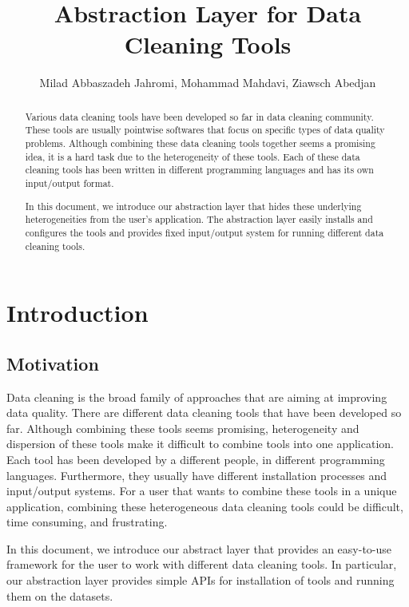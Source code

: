 \documentclass[12pt]{article}
\title{Abstraction Layer for Data Cleaning Tools}
\author{Milad Abbaszadeh Jahromi\inst{1}, Mohammad Mahdavi\inst{1}, Ziawsch Abedjan\inst{1}}
\begin{document}
 
\maketitle


\begin{abstract} 
	Various data cleaning tools have been developed so far in data cleaning community. These tools are usually pointwise softwares that focus on specific types of data quality problems. Although combining these data cleaning tools together seems a promising idea, it is a hard task due to the heterogeneity of these tools. Each of these data cleaning tools has been written in different programming languages and has its own input/output format.
	
	In this document, we introduce our abstraction layer that hides these underlying heterogeneities from the user's application. The abstraction layer easily installs and configures the tools and provides fixed input/output system for running different data cleaning tools.
\end{abstract}


\section{Introduction}
\label{section:introduction}

\subsection{Motivation}
Data cleaning is the broad family of approaches that are aiming at improving data quality. There are different data cleaning tools that have been developed so far. Although combining these tools seems promising, heterogeneity and dispersion of these tools make it difficult to combine tools into one application. Each tool has been developed by a different people, in different programming languages. Furthermore, they usually have different installation processes and input/output systems. For a user that wants to combine these tools in a unique application, combining these heterogeneous data cleaning tools could be difficult, time consuming, and frustrating. 

In this document, we introduce our abstract layer that provides an easy-to-use framework for the user to work with different data cleaning tools. In particular, our abstraction layer provides simple APIs for installation of tools and running them on the datasets. 
\end{document}
